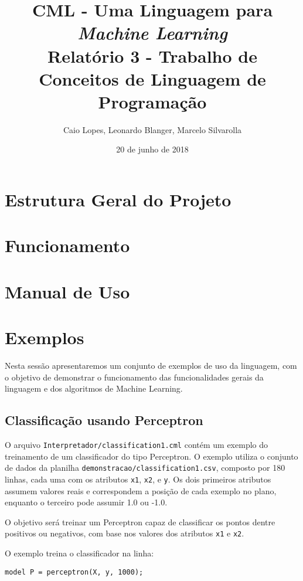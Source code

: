 \documentclass[12pt]{article}
\title{CML - Uma Linguagem para {\it Machine Learning} \\ \Large Relatório 3 - Trabalho de Conceitos de Linguagem de Programação}
\author{Caio Lopes, Leonardo Blanger, Marcelo Silvarolla}
\date{20 de junho de 2018}
\begin{document}
\lstset{
  basicstyle=\ttfamily,
  columns=fullflexible,
  keepspaces=true,
  mathescape
}

\maketitle
\tableofcontents
\newpage
\section{Estrutura Geral do Projeto}

\section{Funcionamento}

\section{Manual de Uso}

\section{Exemplos}

Nesta sessão apresentaremos um conjunto de exemplos de uso da linguagem, com o objetivo de demonstrar o funcionamento das funcionalidades gerais da linguagem e dos algoritmos de Machine Learning.

\subsection{Classificação usando Perceptron}

O arquivo \texttt{Interpretador/classification1.cml} contém um exemplo do treinamento de um classificador do tipo Perceptron. O exemplo utiliza o conjunto de dados da planilha \texttt{demonstracao/classification1.csv}, composto por 180 linhas, cada uma com os atributos \texttt{x1}, \texttt{x2}, e \texttt{y}. Os dois primeiros atributos assumem valores reais e correspondem a posição de cada exemplo no plano, enquanto o terceiro pode assumir 1.0 ou -1.0.

O objetivo será treinar um Perceptron capaz de classificar os pontos dentre positivos ou negativos, com base nos valores dos atributos \texttt{x1} e \texttt{x2}.

O exemplo treina o classificador na linha:

\begin{verbatim}
model P = perceptron(X, y, 1000);
\end{verbatim}
\end{document}
